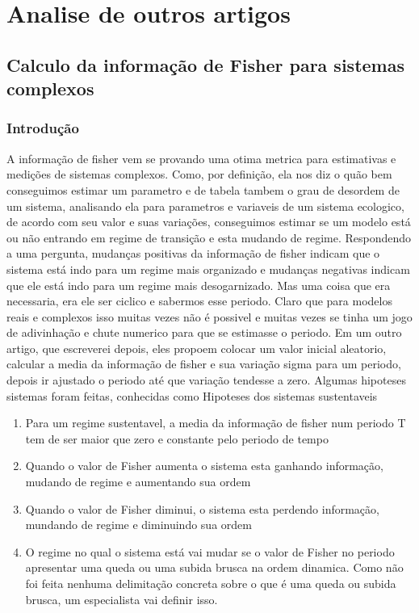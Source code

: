 \chapter{Analise de outros artigos}
\section{Calculo da informação de Fisher para sistemas complexos}
\subsection{Introdução}
\label{sec:Calculo do periodo}
A informação de fisher vem se provando uma otima metrica para estimativas e medições de sistemas complexos.
Como, por definição, ela nos diz o quão bem conseguimos estimar um parametro e de tabela tambem o grau
de desordem de um sistema, analisando ela para parametros e variaveis de um sistema ecologico, de
acordo com seu valor e suas variações, conseguimos estimar se um modelo está ou não entrando em
regime de transição e esta mudando de regime. Respondendo a uma pergunta, mudanças positivas da
informação de fisher indicam que o sistema está indo para um regime mais organizado e mudanças
negativas indicam que ele está indo para um regime mais desogarnizado. Mas uma coisa que era
necessaria, era ele ser ciclico e sabermos esse periodo. Claro que para modelos reais e complexos
isso muitas vezes não é possivel e muitas vezes se tinha um jogo de adivinhação e chute numerico
para que se estimasse o periodo. Em um outro artigo, que escreverei depois, eles propoem colocar um
valor inicial aleatorio, calcular a media da informação de fisher e sua variação sigma para um
periodo, depois ir ajustado o periodo até que variação tendesse a zero. Algumas hipoteses sistemas
foram feitas, conhecidas como Hipoteses dos sistemas sustentaveis
\begin{enumerate}\label{hip:Hipotese dos modelos sustentaveis}
    \item Para um regime sustentavel, a media da informação de fisher num periodo T tem de ser maior que
    zero e constante pelo periodo de tempo
    
    \item Quando o valor de Fisher aumenta o sistema esta ganhando informação, mudando de regime e
    aumentando sua ordem
    
    \item Quando o valor de Fisher diminui, o sistema esta perdendo informação, mundando de regime e
    diminuindo sua ordem
    
    \item O regime no qual o sistema está vai mudar se o valor de Fisher no periodo apresentar uma
    queda ou uma subida brusca na ordem dinamica. Como não foi feita nenhuma delimitação concreta
    sobre o que é uma queda ou subida brusca, um especialista vai definir isso.
\end{enumerate}
